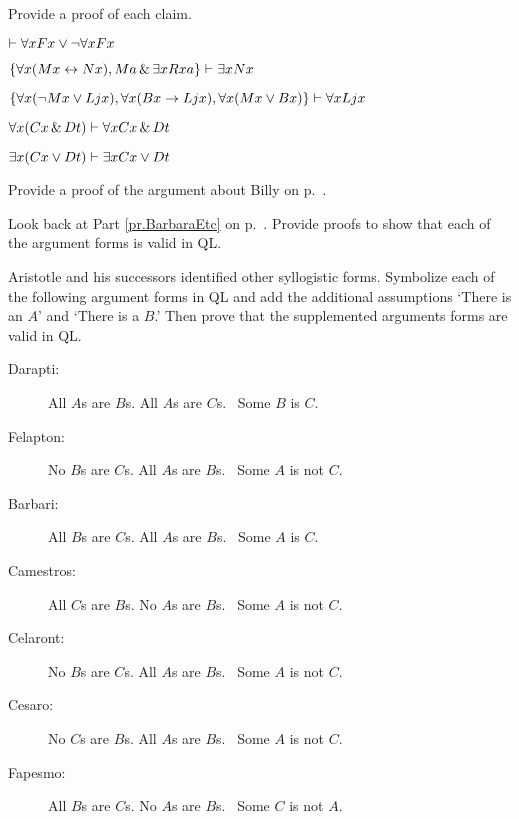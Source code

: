 \solutions
\problempart
\label{pr.someQLproofs}
Provide a proof of each claim.
\begin{earg}
\item $\vdash \forall x Fx \vee \neg \forall x Fx$
\item $\{\forall x(Mx \leftrightarrow Nx), Ma\,\&\,\exists x Rxa\}\vdash \exists x Nx$
\item $\{\forall x(\neg Mx \vee Ljx), \forall x(Bx\rightarrow Ljx), \forall x(Mx\vee Bx)\}\vdash \forall xLjx$
\item $\forall x(Cx \,\&\, Dt)\vdash \forall xCx \,\&\, Dt$
\item $\exists x(Cx \vee Dt)\vdash \exists x Cx \vee Dt$
\end{earg}

\problempart
Provide a proof of the argument about Billy on p.~\pageref{surgeon2}.



\problempart
\label{pr.BarbaraEtc.proof1}
Look back at Part \ref{pr.BarbaraEtc} on p.~\pageref{pr.BarbaraEtc}. Provide proofs to show that each of the argument forms is valid in QL.



\problempart
\label{pr.BarbaraEtc.proof2}
Aristotle and his successors identified other syllogistic forms. Symbolize each of the following argument forms in QL and add the additional assumptions `There is an $A$' and `There is a $B$.' Then prove that the supplemented arguments forms are valid in QL.

\begin{description}
\item[Darapti:] All $A$s are $B$s. All $A$s are $C$s.
	\therefore\  Some $B$ is $C$.
\item[Felapton:] No $B$s are $C$s. All $A$s are $B$s.
	\therefore\  Some $A$ is not $C$.
\item[Barbari:] All $B$s are $C$s. All $A$s are $B$s.
	\therefore\  Some $A$ is $C$.
\item[Camestros:] All $C$s are $B$s. No $A$s are $B$s.
	\therefore\  Some $A$ is not $C$.
\item[Celaront:] No $B$s are $C$s. All $A$s are $B$s.
	\therefore\  Some $A$ is not $C$.
\item[Cesaro:] No $C$s are $B$s. All $A$s are $B$s.
	\therefore\  Some $A$ is not $C$.
\item[Fapesmo:] All $B$s are $C$s. No $A$s are $B$s.
	\therefore\  Some $C$ is not $A$.
\end{description}



